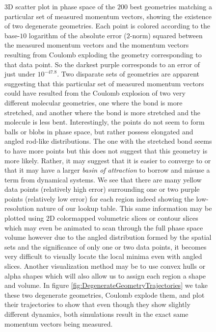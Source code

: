 \begin{figure}
  {3D scatter plot in phase space of the $200$ best geometries matching a particular set of measured momentum vectors, showing the existence of two degenerate geometries. Each point is colored according to the base-$10$ logarithm of the absolute error ($2$-norm) squared between the measured momentum vectors and the momentum vectors resulting from Coulomb exploding the geometry corresponding to that data point. So the darkest purple corresponds to an error of just under $10^{-47.8}$. Two disparate sets of geometries are apparent suggesting that this particular set of measured momentum vectors could have resulted from the Coulomb explosion of two very different molecular geometries, one where the  bond is more stretched, and another where the  bond is more stretched and the molecule is less bent. Interestingly, the points do not seem to form balls or blobs in phase space, but rather possess elongated and angled rod-like distributions. The one with the stretched  bond seems to have more points but this does not suggest that this geometry is more likely. Rather, it may suggest that it is easier to converge to or that it may have a larger \emph{basin of attraction} to borrow and misuse a term from dynamical systems. We see that there are many yellow data points (relatively high error) surrounding one or two purple points (relatively low error) for each region indeed showing the low-resolution nature of our lookup table. This same information may be plotted using $2$D colormapped volumetric slices or contour slices which may even be animated to scan through the full phase space volume however due to the angled distribution formed by the spatial sets and the significance of only one or two data points, it becomes very difficult to visually locate the local minima even with angled slices. Another visualization method may be to use convex hulls or alpha shapes which will also allow us to assign each region a shape and volume. In figure \ref{fig:DegenerateGeometryTrajectories} we take these two degenerate geometries, Coulomb explode them, and plot their trajectories to show that even though they show slightly different dynamics, both simulations result in the exact same momentum vectors being measured.}
  \label{fig:rainbow}
\end{figure}

